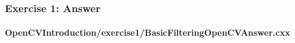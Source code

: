 \begin{frame}[fragile]
\frametitle{Exercise 1: Answer}
\framesubtitle{OpenCVIntroduction/exercise1/BasicFilteringOpenCVAnswer.cxx}
\begin{center}
\begin{itemize}

\end{itemize}
\end{center}
\end{frame}
